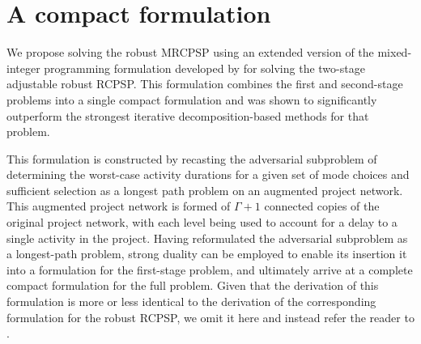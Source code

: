 \documentclass[a4paper,abstracton]{scrartcl}
\begin{document}
\section{A compact formulation}\label{section:compact_formulation}

We propose solving the robust MRCPSP using an extended version of the mixed-integer programming formulation developed by \cite{bold2021compact} for solving the two-stage adjustable robust RCPSP. This formulation combines the first and second-stage problems into a single compact formulation and was shown to significantly outperform the strongest iterative decomposition-based methods for that problem.

This formulation is constructed by recasting the adversarial subproblem of determining the worst-case activity durations for a given set of mode choices and sufficient selection as a longest path problem on an augmented project network. This augmented project network is formed of $\Gamma+1$ connected copies of the original project network, with each level being used to account for a delay to a single activity in the project. Having reformulated the adversarial subproblem as a longest-path problem, strong duality can be employed to enable its insertion it into a formulation for the first-stage problem, and ultimately arrive at a complete compact formulation for the full problem. Given that the derivation of this formulation is more or less identical to the derivation of the corresponding formulation for the robust RCPSP, we omit it here and instead refer the reader to \cite{bold2021compact}.
\end{document}
